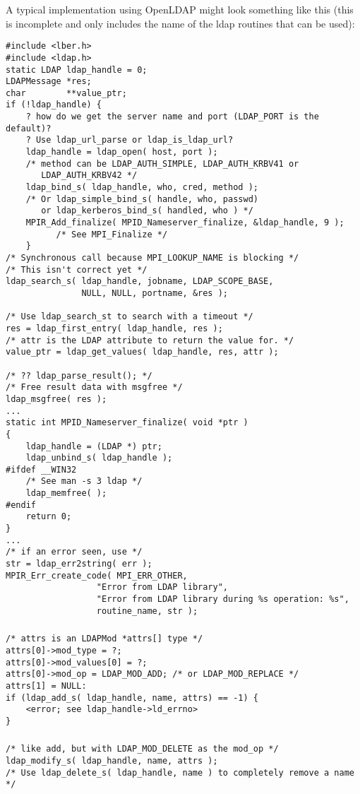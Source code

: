\documentclass{article}
\begin{document}
A typical implementation using OpenLDAP might look something like
this (this is incomplete and only includes the name of the ldap
routines that can be used):
\begin{verbatim}
#include <lber.h>
#include <ldap.h>
static LDAP ldap_handle = 0;
LDAPMessage *res;
char        **value_ptr;
if (!ldap_handle) {
    ? how do we get the server name and port (LDAP_PORT is the default)?
    ? Use ldap_url_parse or ldap_is_ldap_url?
    ldap_handle = ldap_open( host, port );
    /* method can be LDAP_AUTH_SIMPLE, LDAP_AUTH_KRBV41 or 
       LDAP_AUTH_KRBV42 */
    ldap_bind_s( ldap_handle, who, cred, method );
    /* Or ldap_simple_bind_s( handle, who, passwd) 
       or ldap_kerberos_bind_s( handled, who ) */
    MPIR_Add_finalize( MPID_Nameserver_finalize, &ldap_handle, 9 );  
          /* See MPI_Finalize */
    }
/* Synchronous call because MPI_LOOKUP_NAME is blocking */
/* This isn't correct yet */
ldap_search_s( ldap_handle, jobname, LDAP_SCOPE_BASE, 
               NULL, NULL, portname, &res );

/* Use ldap_search_st to search with a timeout */
res = ldap_first_entry( ldap_handle, res );
/* attr is the LDAP attribute to return the value for. */
value_ptr = ldap_get_values( ldap_handle, res, attr );

/* ?? ldap_parse_result(); */
/* Free result data with msgfree */
ldap_msgfree( res );
...
static int MPID_Nameserver_finalize( void *ptr )
{
    ldap_handle = (LDAP *) ptr;
    ldap_unbind_s( ldap_handle );
#ifdef __WIN32
    /* See man -s 3 ldap */
    ldap_memfree( );
#endif
    return 0;
}
...
/* if an error seen, use */
str = ldap_err2string( err );
MPIR_Err_create_code( MPI_ERR_OTHER, 
                  "Error from LDAP library",
                  "Error from LDAP library during %s operation: %s", 
                  routine_name, str );
\end{verbatim}

\subsubsection{}
\begin{verbatim}
/* attrs is an LDAPMod *attrs[] type */
attrs[0]->mod_type = ?;
attrs[0]->mod_values[0] = ?;
attrs[0]->mod_op = LDAP_MOD_ADD; /* or LDAP_MOD_REPLACE */
attrs[1] = NULL:
if (ldap_add_s( ldap_handle, name, attrs) == -1) {
    <error; see ldap_handle->ld_errno>
}
\end{verbatim}

\subsubsection{}
\begin{verbatim}
/* like add, but with LDAP_MOD_DELETE as the mod_op */
ldap_modify_s( ldap_handle, name, attrs );
/* Use ldap_delete_s( ldap_handle, name ) to completely remove a name */
\end{verbatim}
\end{document}
